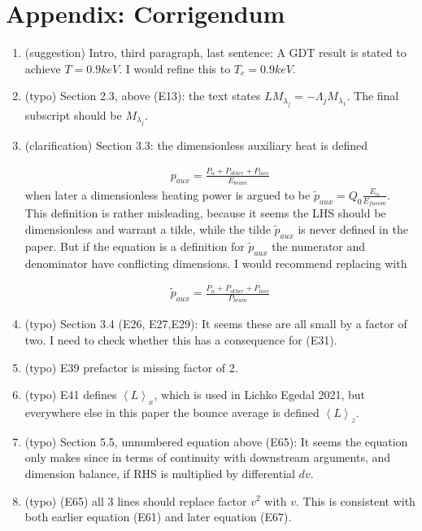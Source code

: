 \documentclass{article}
\numberwithin{equation}{section}
\newcommand\avg[1]{\left< #1 \right> }
\newcommand\eq[1]{
    \begin{equation}
        \begin{split} #1 \end{split}
    \end{equation} }
\begin{document}
\section{Appendix: Corrigendum}
\begin{enumerate}
\item (suggestion) Intro, third paragraph, last sentence: A GDT result is stated to achieve $T = 0.9 keV$. I would refine this to $T_e = 0.9 keV$.

\item (typo) Section 2.3, above (E13): the text states $L M_{\lambda _j} = - \Lambda_j M_{\lambda_1}$. The final subscript should be $M_{\lambda _j}$.

\item  (clarification) Section 3.3: the dimensionless auxiliary heat is defined
\eq{
	p_{aux} = \frac{P_\alpha + P_{other} + P_{loss}}{E_{beam}}
} when later a dimensionless heating power is argued to be $\tilde p_{aux} = Q_0 \frac{E_\alpha}{E_{fusion}}$.
This definition is rather misleading, because it seems the LHS should be dimensionless and warrant a tilde, while the tilde $\tilde p_{aux}$ is never defined in the paper. But if the equation is a definition for $\tilde p_{aux}$ the numerator and denominator have conflicting dimensions. I would recommend replacing with
\eq{
	\tilde p_{aux} = \frac{P_\alpha + P_{other} + P_{loss}}{P_{beam}}
}

\item (typo) Section 3.4 (E26, E27,E29):
It seems these are all small by a factor of two. I need to check whether this has a consequence for (E31).

\item (typo) E39 prefactor is missing factor of 2.

\item (typo) E41 defines $\avg{L}_x$, which is used in Lichko Egedal 2021, but everywhere else in this paper the bounce average is defined $\avg{L}_z$.

\item (typo) Section 5.5, unnumbered equation above (E65):
It seems the equation only makes since in terms of continuity with downstream arguments, and dimension balance, if RHS is multiplied by differential $dv$.

\item (typo) (E65) all 3 lines should replace factor $v^2$ with $v$. This is consistent with both earlier equation (E61) and later equation (E67).

\end{enumerate}
\end{document}
